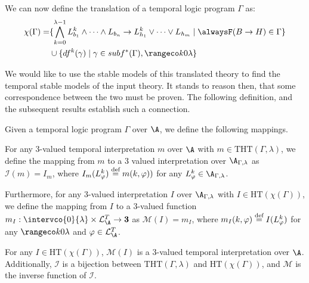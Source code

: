 We can now define the translation of a temporal logic program $\Gamma$
as:
\begin{align*}
  \chi(\Gamma)  = &\{ \bigwedge_{k=0}^{\lambda-1} L_{b_1}^k \land \dots \land L_{b_n}
                    \rightarrow L_{h_1}^k \lor \dots \lor L_{h_m} \mid \tempruleshort \in \Gamma \} \\
                  & \cup \{ df^k(\gamma) \mid \gamma \in subf^*(\Gamma), \kinlambda \}
\end{align*}

We would like to use the stable models of this translated theory to
find the temporal stable models of the input theory. It stands to
reason then, that some correspondence between the two must be
proven. The following definition, and the subsequent results establish
such a connection.
\begin{definition}
  Given a temporal logic program $\Gamma$ over $\A$, we define the
  following mappings.  

  For any 3-valued temporal interpretation $m$
  over $\A$ with $m \in \text{THT}(\Gamma,\lambda)$, we define the
  mapping from $m$ to a 3 valued interpretation over
  $\A_{\Gamma,\lambda}$ as $\mathcal{I}(m) = I_m$, where
  $I_m(L^k_\varphi) \stackrel{\text{def}}{=} m(k,\varphi))$ for any
  $L^k_\varphi \in \A_{\Gamma,\lambda}$.

  Furthermore, for any 3-valued interpretation $I$ over
  $\A_{\Gamma,\lambda}$ with $I \in \text{HT}(\chi(\Gamma))$, we
  define the mapping from $I$ to a 3-valued function
  $m_I: \intervco{0}{\lambda} \times \mathcal{L}_{\A}^{T} \rightarrow
  \textbf{3}$ as $\mathcal{M}(I) = m_I$, where
  $m_I(k,\varphi) \stackrel{\text{def}}{=} I(L_{\varphi}^k)$ for any $\kinlambda$ and
  $\varphi \in \mathcal{L}_{\A}^{T}$.
\end{definition}

\begin{theorem}\label{theorem:translation}

  For any $I \in \text{HT}(\chi(\Gamma))$, $\mathcal{M}(I)$ is a
  3-valued temporal interpretation over $\A$. Additionally,
  $\mathcal{I}$ is a bijection between $\text{THT}(\Gamma,\lambda)$
  and $\text{HT}(\chi(\Gamma))$, and $\mathcal{M}$ is the inverse
  function of $\mathcal{I}$.
\end{theorem}

